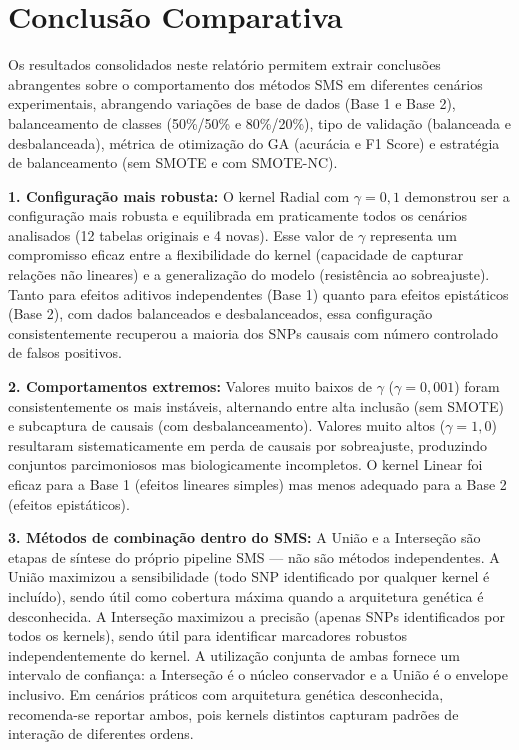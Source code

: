 \documentclass[
    12pt,
    a4paper,
    oneside,
    english,
    french,
    spanish,
    brazil
    ]{abntex2}
\newcommand{\novo}[1]{\textcolor{corNova}{#1}}
\begin{document}
\chapter{Conclusão Comparativa}

\novo{Os resultados consolidados neste relatório permitem extrair conclusões abrangentes sobre o comportamento dos métodos SMS em diferentes cenários experimentais, abrangendo variações de base de dados (Base 1 e Base 2), balanceamento de classes (50\%/50\% e 80\%/20\%), tipo de validação (balanceada e desbalanceada), métrica de otimização do GA (acurácia e F1 Score) e estratégia de balanceamento (sem SMOTE e com SMOTE-NC).}

\novo{\textbf{1. Configuração mais robusta:} O kernel Radial com $\gamma = 0{,}1$ demonstrou ser a configuração mais robusta e equilibrada em praticamente todos os cenários analisados (12 tabelas originais e 4 novas). Esse valor de $\gamma$ representa um compromisso eficaz entre a flexibilidade do kernel (capacidade de capturar relações não lineares) e a generalização do modelo (resistência ao sobreajuste). Tanto para efeitos aditivos independentes (Base 1) quanto para efeitos epistáticos (Base 2), com dados balanceados e desbalanceados, essa configuração consistentemente recuperou a maioria dos SNPs causais com número controlado de falsos positivos.}

\novo{\textbf{2. Comportamentos extremos:} Valores muito baixos de $\gamma$ ($\gamma = 0{,}001$) foram consistentemente os mais instáveis, alternando entre alta inclusão (sem SMOTE) e subcaptura de causais (com desbalanceamento). Valores muito altos ($\gamma = 1{,}0$) resultaram sistematicamente em perda de causais por sobreajuste, produzindo conjuntos parcimoniosos mas biologicamente incompletos. O kernel Linear foi eficaz para a Base 1 (efeitos lineares simples) mas menos adequado para a Base 2 (efeitos epistáticos).}

\novo{\textbf{3. Métodos de combinação dentro do SMS:} A União e a Interseção são etapas de síntese do próprio pipeline SMS --- não são métodos independentes. A União maximizou a sensibilidade (todo SNP identificado por qualquer kernel é incluído), sendo útil como cobertura máxima quando a arquitetura genética é desconhecida. A Interseção maximizou a precisão (apenas SNPs identificados por todos os kernels), sendo útil para identificar marcadores robustos independentemente do kernel. A utilização conjunta de ambas fornece um intervalo de confiança: a Interseção é o núcleo conservador e a União é o envelope inclusivo. Em cenários práticos com arquitetura genética desconhecida, recomenda-se reportar ambos, pois kernels distintos capturam padrões de interação de diferentes ordens.}
\end{document}
